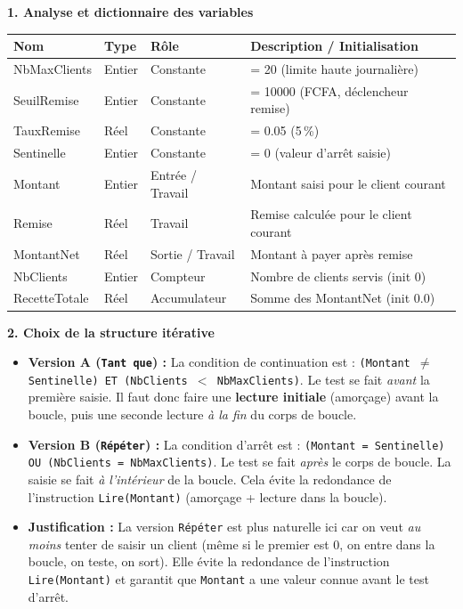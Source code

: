 \documentclass[11pt]{article}
\newcommand{\cle}[1]{{\popxbold\color{popdark}#1}}
\newcounter{popsec}
\newcounter{popsub}
\newcommand{\courssub}[1]{%
  \stepcounter{popsub}%
  \par\vspace{9pt}\noindent{\popxbold\fontsize{11.5}{13}\selectfont\color{popink}{\color{poporange}\thepopsec.\thepopsub}\hspace{6pt}#1}\par\nopagebreak\vspace{4pt}
}
\begin{document}
\courssub{Démarche et corrigé commenté}
\begin{exoresolu}
\textbf{1. Analyse et dictionnaire des variables}\par
\begin{center}
\begin{tabularx}{\linewidth}{|l|l|l|X|}\hline
\textbf{Nom} & \textbf{Type} & \textbf{Rôle} & \textbf{Description / Initialisation} \\\hline
\cle{NbMaxClients} & Entier & Constante & = 20 (limite haute journalière) \\\hline
\cle{SeuilRemise} & Entier & Constante & = 10000 (FCFA, déclencheur remise) \\\hline
\cle{TauxRemise} & Réel & Constante & = 0.05 (5\,\%) \\\hline
\cle{Sentinelle} & Entier & Constante & = 0 (valeur d'arrêt saisie) \\\hline
\cle{Montant} & Entier & Entrée / Travail & Montant saisi pour le client courant \\\hline
\cle{Remise} & Réel & Travail & Remise calculée pour le client courant \\\hline
\cle{MontantNet} & Réel & Sortie / Travail & Montant à payer après remise \\\hline
\cle{NbClients} & Entier & Compteur & Nombre de clients servis (init 0) \\\hline
\cle{RecetteTotale} & Réel & Accumulateur & Somme des MontantNet (init 0.0) \\\hline
\end{tabularx}
\end{center}

\textbf{2. Choix de la structure itérative}\par
\begin{itemize}
    \item \textbf{Version A (\texttt{Tant que}) :} La condition de continuation est : \texttt{(Montant $\neq$ Sentinelle) ET (NbClients $<$ NbMaxClients)}. Le test se fait \emph{avant} la première saisie. Il faut donc faire une \textbf{lecture initiale} (amorçage) avant la boucle, puis une seconde lecture \emph{à la fin} du corps de boucle.
    \item \textbf{Version B (\texttt{Répéter}) :} La condition d'arrêt est : \texttt{(Montant = Sentinelle) OU (NbClients = NbMaxClients)}. Le test se fait \emph{après} le corps de boucle. La saisie se fait \emph{à l'intérieur} de la boucle. Cela évite la redondance de l'instruction \texttt{Lire(Montant)} (amorçage + lecture dans la boucle).
    \item \textbf{Justification :} La version \texttt{Répéter} est plus naturelle ici car on veut \emph{au moins} tenter de saisir un client (même si le premier est 0, on entre dans la boucle, on teste, on sort). Elle évite la redondance de l'instruction \texttt{Lire(Montant)} et garantit que \texttt{Montant} a une valeur connue avant le test d'arrêt.
\end{itemize}


\end{exoresolu}
\end{document}
